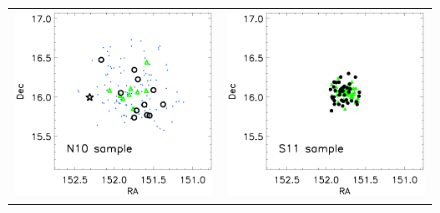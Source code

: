 \documentclass{emulateapj}
\begin{document}
\begin{figure}
\begin{center}
\begin{tabular}{cc}
    \includegraphics[width=8.5cm,clip=true,bbllx=50, bblly=360,bburx=502, bbury=714]{coord1.ps}  & 
    \includegraphics[width=8.5cm,clip=true,bbllx=50, bblly=360,bburx=502, bbury=714]{coord2.ps}  \\


\end{tabular}
\end{center}
\end{figure}
\end{document}

